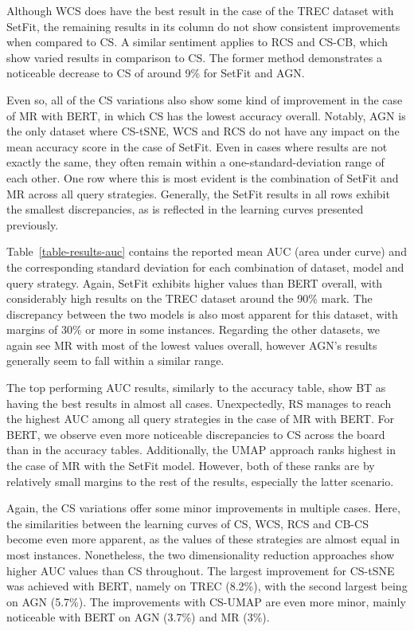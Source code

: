 \documentclass[english,bachelor,ul]{webisthesis} %
\begin{document}
Although WCS does have the best result in the case of the TREC dataset with SetFit, the remaining results in its column do not show consistent improvements when compared to CS. A similar sentiment applies to RCS and CS-CB, which show varied results in comparison to CS. The former method demonstrates a noticeable decrease to CS of around 9\% for SetFit and AGN.

Even so, all of the CS variations also show some kind of improvement in the case of MR with BERT, in which CS has the lowest accuracy overall. Notably, AGN is the only dataset where CS-tSNE, WCS and RCS do not have any impact on the mean accuracy score in the case of SetFit. Even in cases where results are not exactly the same, they often remain within a one-standard-deviation range of each other. One row where this is most evident is the combination of SetFit and MR across all query strategies. Generally, the SetFit results in all rows exhibit the smallest discrepancies, as is reflected in the learning curves presented previously.

Table~\ref{table-results-auc} contains the reported mean AUC (area under curve) and the corresponding standard deviation for each combination of dataset, model and query strategy. Again, SetFit exhibits higher values than BERT overall, with considerably high results on the TREC dataset around the 90\% mark. The discrepancy between the two models is also most apparent for this dataset, with margins of 30\% or more in some instances. Regarding the other datasets, we again see MR with most of the lowest values overall, however AGN's results generally seem to fall within a similar range. 

The top performing AUC results, similarly to the accuracy table, show BT as having the best results in almost all cases. Unexpectedly, RS manages to reach the highest AUC among all query strategies in the case of MR with BERT. For BERT, we observe even more noticeable discrepancies to CS across the board than in the accuracy tables. Additionally, the UMAP approach ranks highest in the case of MR with the SetFit model. However, both of these ranks are by relatively small margins to the rest of the results, especially the latter scenario. 

Again, the CS variations offer some minor improvements in multiple cases. Here, the similarities between the learning curves of CS, WCS, RCS and CB-CS become even more apparent, as the values of these strategies are almost equal in most instances. Nonetheless, the two dimensionality reduction approaches show higher AUC values than CS throughout. The largest improvement for CS-tSNE was achieved with BERT, namely on TREC (8.2\%), with the second largest being on AGN (5.7\%). The improvements with CS-UMAP are even more minor, mainly noticeable with BERT on AGN (3.7\%) and MR (3\%). 
\end{document}
